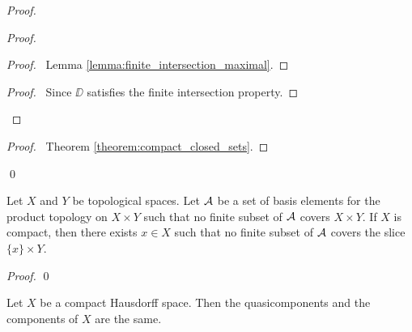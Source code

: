 \begin{proof}
\begin{proof}
\begin{proof}
            \pf\ Lemma \ref{lemma:finite_intersection_maximal}.
        \end{proof}
        \begin{proof}
            \pf\ Since $\DD$ satisfies the finite intersection property.
        \end{proof}
    \end{proof}
    \qedstep
    \begin{proof}
        \pf\ Theorem \ref{theorem:compact_closed_sets}.
    \end{proof}
    \qed
\end{proof}

\begin{lemma}
    \label{lemma:preTychonoff}
    Let $X$ and $Y$ be topological spaces.
    Let $\AA$ be a set of basis elements for the product topology on $X \times Y$ such that no finite subset of $\AA$ covers $X \times Y$.
    If $X$ is compact, then there exists $x \in X$ such that no finite subset of $\AA$ covers the slice $\{x\} \times Y$.
\end{lemma}

\begin{proof}
    \pf
    \qed
\end{proof}

\begin{theorem}[AC]
    Let $X$ be a compact Hausdorff space. Then the quasicomponents and the components of $X$ are the same.
\end{theorem}

